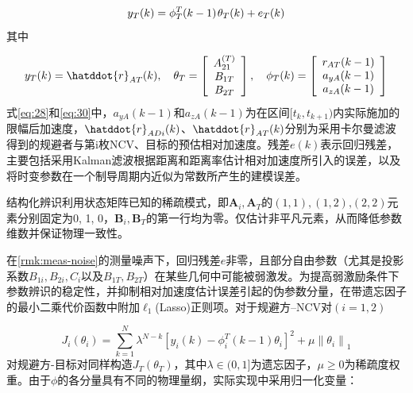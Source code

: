 \begin{equation}
\label{eq:29}
{y_T}(k) = \phi _T^T(k - 1){\kern 1pt} {\theta _T}(k) + {e_T}(k)
\end{equation}
其中

\begin{equation}
\label{eq:30}
{y_T}(k) = \hatddot{r}_{AT}(k),\quad {\theta _T} = \left[ {\begin{array}{*{20}{c}}
  {A_{21}^{(T)}} \\ 
  {{B_{1T}}} \\ 
  {{B_{2T}}} 
\end{array}} \right],\quad {\phi _T}(k) = \left[ {\begin{array}{*{20}{c}}
  {{r_{AT}}(k - 1)} \\ 
  {{a_{yA}}(k - 1)} \\ 
  {{a_{zA}}(k - 1)} 
\end{array}} \right]
\end{equation}
式\eqref{eq:28}和\eqref{eq:30}中，${a_{yA}}(k - 1)$和${a_{zA}}(k - 1)$为在区间$[{t_k},{t_{k + 1}})$内实际施加的限幅后加速度，$\hatddot{r}_{ADi}(k)$、$\hatddot{r}_{AT}(k)$分别为采用卡尔曼滤波得到的规避者与第i枚NCV、目标的预估相对加速度。残差$e(k)$表示回归残差，主要包括采用Kalman滤波根据距离和距离率估计相对加速度所引入的误差，以及将时变参数在一个制导周期内近似为常数所产生的建模误差。

结构化辨识利用状态矩阵已知的稀疏模式，即${{\mathbf{A}}_i},{{\mathbf{A}}_T}$的$(1,1),(1,2){\text{,}}(2,2)$元素分别固定为0, 1, 0，${{\mathbf{B}}_i},{{\mathbf{B}}_T}$的第一行均为零。仅估计非平凡元素，从而降低参数维数并保证物理一致性。

在\cref{rmk:meas-noise}的测量噪声下，回归残差$e$非零，且部分自由参数（尤其是投影系数${B_{1i}},{B_{2i}},{C_i}$以及${B_{1T}},{B_{2T}}$）在某些几何中可能被弱激发。为提高弱激励条件下参数辨识的稳定性，并抑制相对加速度估计误差引起的伪参数分量，在带遗忘因子的最小二乘代价函数中附加${\ell _1}$(Lasso)正则项。对于规避方–NCV对$(i = 1,2)$

\begin{equation}
\label{eq:31}
{J_i}({\theta _i}) = \sum\limits_{k = 1}^N {{\lambda ^{N - k}}} {\left[ {{y_i}(k) - \phi _i^T(k - 1){\theta _i}} \right]^2} + \mu {\left\| {{\theta _i}} \right\|_1}
\end{equation}
对规避方-目标对同样构造${J_T}({\theta _T})$，其中$\lambda  \in (0,1]$为遗忘因子，$\mu  \geqslant 0$为稀疏度权重。由于$\phi $的各分量具有不同的物理量纲，实际实现中采用归一化变量：

